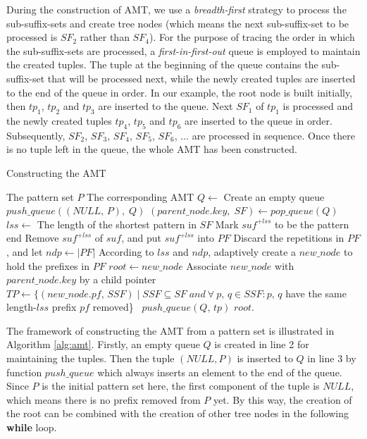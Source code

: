 \documentclass{article}
\begin{document}
During the construction of AMT, we use a \emph{breadth-first} strategy
to process the sub-suffix-sets and create tree nodes (which means the
next sub-suffix-set to be processed is $SF_2$ rather than $SF_4$). For
the purpose of tracing the order in which the sub-suffix-sets are
processed, a \emph{first-in-first-out} queue is employed to maintain
the created tuples. The tuple at the beginning of the queue contains
the sub-suffix-set that will be processed next, while the newly
created tuples are inserted to the end of the queue in order. In our
example, the root node is built initially, then $tp_1$, $tp_2$ and
$tp_3$ are inserted to the queue. Next $SF_1$ of $tp_1$ is processed
and the newly created tuples $tp_4$, $tp_5$ and $tp_6$ are inserted to
the queue in order. Subsequently, $SF_2$, $SF_3$, $SF_4$, $SF_5$,
$SF_6$, $\dots$ are processed in sequence. Once there is no tuple left
in the queue, the whole AMT has been constructed.

\begin{algorithm}
  \caption{Constructing the AMT}\scriptsize
  \label{alg:amt}
  \begin{algorithmic}[1]
    \REQUIRE The pattern set $P$
    \ENSURE The corresponding AMT
    \STATE
    \STATE $Q \leftarrow$ Create an empty queue
    \STATE $push\_queue((NULL,\,P),\; Q)$
    \STATE
    \STATE $(parent\_node.key,\; SF) \leftarrow pop\_queue(Q)$
    \STATE $lss \leftarrow$ The length of the shortest pattern in $SF$
    \STATE Mark $suf^{+lss}$ to be the pattern end
    \ENDIF
    \STATE Remove $suf^{+lss}$ of $suf$, and put $suf^{+lss}$ into $PF$
    \ENDFOR
    \STATE Discard the repetitions in $PF$, and let $ndp \leftarrow |PF|$
    \STATE According to $lss$ and $ndp$, adaptively create a
    $new\_node$ to hold the prefixes in
    $PF$
    \STATE $root \leftarrow new\_node$
    \ELSE
    \STATE Associate $new\_node$
    with $parent\_node.key$ by a child pointer
    \ENDIF
    \STATE $TP \leftarrow \{(new\_node.pf,\, SSF) \mid SSF \subseteq SF\; and
    \ \forall \ p,\,q \in SSF: p,\,q$ have the same length-$lss$ prefix
    $pf$ removed\}\
    \STATE $push\_queue(Q,\,tp)$
    \ENDFOR
    \ENDWHILE
    \STATE
    \RETURN $root$.
  \end{algorithmic}
\end{algorithm}

The framework of constructing the AMT from a pattern set is
illustrated in Algorithm \ref{alg:amt}. Firstly, an empty queue $Q$ is
created in line 2 for maintaining the tuples. Then the tuple
$(NULL, P)$ is inserted to $Q$ in line 3 by function $push\_queue$
which always inserts an element to the end of the queue. Since $P$ is
the initial pattern set here, the first component of the tuple is
$NULL$, which means there is no prefix removed from $P$ yet. By this
way, the creation of the root can be combined with the creation of
other tree nodes in the following \textbf{while} loop.
\end{document}
